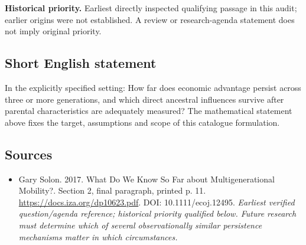 \documentclass[11pt]{article}
\begin{document}
\par\textbf{Historical priority.} Earliest directly inspected qualifying passage in this audit; earlier origins were not established. A review or research-agenda statement does not imply original priority.

\subsection{Short English statement}
In the explicitly specified setting: How far does economic advantage persist across three or more generations, and which direct ancestral influences survive after parental characteristics are adequately measured? The mathematical statement above fixes the target, assumptions and scope of this catalogue formulation.

\subsection{Sources}
\begin{itemize}\raggedright
\item[\textnormal{[S1]}]\hypertarget{source:30007646:1}{} Gary Solon. 2017. What Do We Know So Far about Multigenerational Mobility?. Section 2, final paragraph, printed p. 11.
\url{https://docs.iza.org/dp10623.pdf}.
DOI: 10.1111/ecoj.12495.
{\small\textit{Earliest verified question/agenda reference; historical priority qualified below. Future research must determine which of several observationally similar persistence mechanisms matter in which circumstances.}}
\end{itemize}
\end{document}
